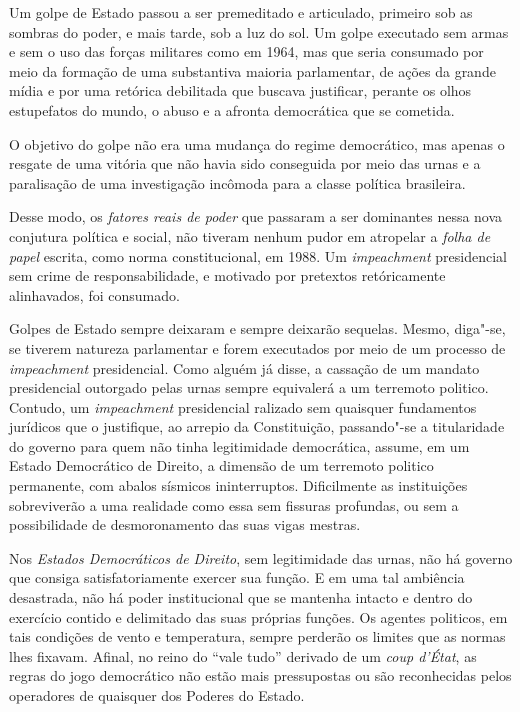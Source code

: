 Um golpe de Estado passou a ser premeditado e articulado, primeiro sob
as sombras do poder, e mais tarde, sob a luz do sol. Um golpe executado
sem armas e sem o uso das forças militares como em 1964, mas que seria
consumado por meio da formação de uma substantiva maioria parlamentar,
de ações da grande mídia e por uma retórica debilitada que buscava
justificar, perante os olhos estupefatos do mundo, o abuso e a afronta
democrática que se cometida.

O objetivo do golpe não era uma mudança do regime democrático, mas
apenas o resgate de uma vitória que não havia sido conseguida por meio
das urnas e a paralisação de uma investigação incômoda para a classe
política brasileira.

Desse modo, os \emph{fatores reais de poder} que passaram a ser
dominantes nessa nova conjutura política e social, não tiveram nenhum
pudor em atropelar a \emph{folha de papel} escrita, como norma
constitucional, em 1988. Um \emph{impeachment} presidencial sem crime de
responsabilidade, e motivado por pretextos retóricamente alinhavados,
foi consumado.

Golpes de Estado sempre deixaram e sempre deixarão sequelas. Mesmo,
diga"-se, se tiverem natureza parlamentar e forem executados por meio de
um processo de \emph{impeachment} presidencial. Como alguém já disse, a
cassação de um mandato presidencial outorgado pelas urnas sempre
equivalerá a um terremoto politico. Contudo, um \emph{impeachment}
presidencial ralizado sem quaisquer fundamentos jurídicos que o
justifique, ao arrepio da Constituição, passando"-se a titularidade do
governo para quem não tinha legitimidade democrática, assume, em um
Estado Democrático de Direito, a dimensão de um terremoto politico
permanente, com abalos sísmicos ininterruptos. Dificilmente as
instituições sobreviverão a uma realidade como essa sem fissuras
profundas, ou sem a possibilidade de desmoronamento das suas vigas
mestras.

Nos \emph{Estados Democráticos de Direito}, sem legitimidade das urnas,
não há governo que consiga satisfatoriamente exercer sua função. E em
uma tal ambiência desastrada, não há poder institucional que se mantenha
intacto e dentro do exercício contido e delimitado das suas próprias
funções. Os agentes politicos, em tais condições de vento e temperatura,
sempre perderão os limites que as normas lhes fixavam. Afinal, no reino
do ``vale tudo'' derivado de um \emph{coup d'État}, as regras do
jogo democrático não estão mais pressupostas ou são reconhecidas pelos
operadores de quaisquer dos Poderes do Estado.

